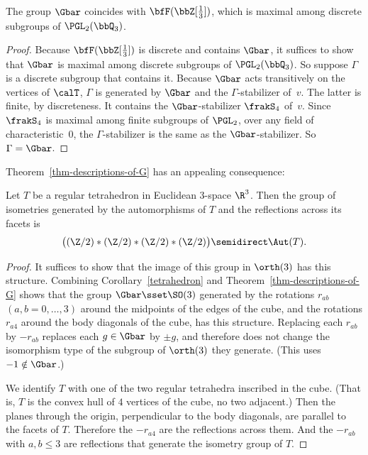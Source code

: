 \begin{theo}\label{ThmGpFunctor}
The group $\Gbar$ coincides with $\bfF(\bbZ[\frac13])$, which is maximal among discrete subgroups of $\PGL_2(\bbQ_3)$.
\end{theo}

\begin{proof}
Because $\bfF(\bbZ[\frac13])$ is discrete and contains $\Gbar$, it suffices to show that $\Gbar$ is maximal among discrete subgroups of $\PGL_2(\bbQ_3)$. So suppose $\Gamma$ is a discrete subgroup that contains it. Because $\Gbar$ acts transitively on the vertices of $\calT$, $\Gamma$ is generated by $\Gbar$ and the $\Gamma$-stabilizer of~$v$. The latter is finite, by discreteness. It contains the $\Gbar$-stabilizer $\frakS_4$ of~$v$. Since $\frakS_4$ is maximal among finite subgroups of $\PGL_2$, over any field of characteristic~$0$, the $\Gamma$-stabilizer is the same as the $\Gbar$-stabilizer. So $\Gamma=\Gbar$.
\end{proof}

Theorem~\ref{thm-descriptions-of-G} has an appealing consequence:

\begin{theo}\label{thm3.8}
\label{thm-tetrahedron-reflections}
Let $T$ be a regular tetrahedron in Euclidean $3$-space $\R^3$. Then the group of isometries generated by the automorphisms of $T$ and the reflections across its facets is
\begin{equation*}
\bigl((\Z/2)*(\Z/2)*(\Z/2)*(\Z/2) \bigr)\semidirect\Aut(T).
\end{equation*}
\end{theo}

\begin{proof}
It suffices to show that the image of this group in $\orth(3)$ has this structure. Combining Corollary~\ref{tetrahedron} and Theorem~\ref{thm-descriptions-of-G} shows that the group $\Gbar\sset\SO(3)$ generated by the rotations $r_{ab}$ $(a,b=0,\dots,3)$ around the midpoints of the edges of the cube, and the rotations $r_{a4}$ around the body diagonals of the cube, has this structure. Replacing each $r_{ab}$ by $-r_{ab}$ replaces each $g\in\Gbar$ by $\pm g$, and therefore does not change the isomorphism type of the subgroup of $\orth(3)$ they generate. (This uses $-1\notin\Gbar$.)

We identify $T$ with one of the two regular tetrahedra inscribed in the cube. (That is, $T$ is the convex hull of $4$ vertices of the cube, no two adjacent.) Then the planes through the origin, perpendicular to the body diagonals, are parallel to the facets of $T$. Therefore the $-r_{a4}$ are the reflections across them. And the $-r_{ab}$ with $a,b\le 3$ are reflections that generate the isometry group of $T$.
\end{proof}

